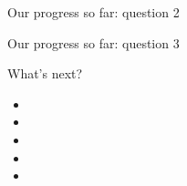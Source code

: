 \documentclass{beamer}
\begin{document}
	\begin{frame}{Our progress so far: question 2}
	\end{frame}
	
	\begin{frame}{Our progress so far: question 3}
	\end{frame}
	
	\begin{frame}{What's next?}
		\begin{itemize}
			\item 
			\item 
			\item 
			\item 
			\item 
		\end{itemize}
	\end{frame}
\end{document}
